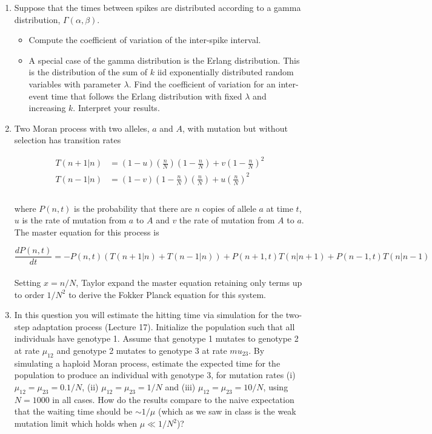 \documentclass[12pt]{article}
\begin{document}
\begin{enumerate}
\item Suppose that the times between spikes are distributed according to a gamma distribution, $\Gamma(\alpha, \beta)$.  
\begin{itemize}
\item Compute the coefficient of variation of the inter-spike interval. 
\item A special case of the gamma distribution is the Erlang distribution. This is the distribution of the sum of $k$ iid exponentially distributed 
random variables with parameter $\lambda$.  Find the coefficient of variation for 
an inter-event time that follows the Erlang distribution with fixed $\lambda$ and increasing $k$.  Interpret your results.
\end{itemize}

\item Two Moran process with two alleles, $a$ and $A$, with mutation but without selection has transition rates 

\begin{eqnarray*}
T(n+1|n)&=(1-u)\left(\frac{n}{N}\right)\left(1-\frac{n}{N}\right)+v\left(1-\frac{n}{N}\right)^2\\
T(n-1|n)&=(1-v)\left(1-\frac{n}{N}\right)\left(\frac{n}{N}\right)+u\left(\frac{n}{N}\right)^2\\
\end{eqnarray*}
\\
where $P(n,t)$ is the probability that there are $n$ copies of allele $a$ at time $t$, $u$ is the rate of mutation from $a$ to $A$ and $v$ the rate of mutation from $A$ to $a$. The master equation for this process is

\begin{equation*}
\frac{dP(n,t)}{dt}=-P(n,t)(T(n+1|n)+T(n-1|n))+P(n+1,t)T(n|n+1)+P(n-1,t)T(n|n-1)
\end{equation*}
\\
Setting $x=n/N$, Taylor expand the master equation retaining only terms up to order $1/N^2$ to derive the Fokker Planck equation for this system.

\item In this question you will estimate the hitting time via simulation for the two-step adaptation process (Lecture 17). Initialize the population such that all individuals have genotype 1. Assume that genotype 1 mutates to genotype 2 at rate $\mu_{12}$ and genotype 2 mutates to genotype 3 at rate $mu_{23}$. By simulating a haploid Moran process, estimate the expected time for the population to produce an individual with genotype 3, for mutation rates (i) $\mu_{12}=\mu_{23}=0.1/N$, (ii) $\mu_{12}=\mu_{23}=1/N$ and (iii)  $\mu_{12}=\mu_{23}=10/N$, using $N=1000$ in all cases. How do the results compare to the naive expectation that the waiting time should be $\sim 1/\mu$ (which as we saw in class is the weak mutation limit which holds when $\mu\ll 1/N^2$)?


\end{enumerate}
\end{document}
